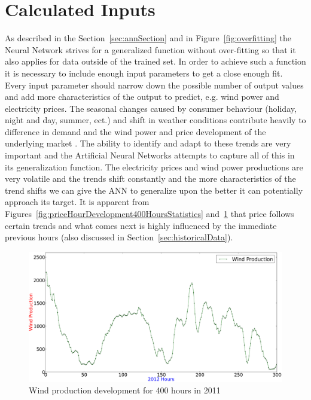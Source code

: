 \section{Calculated Inputs}
\label{sec:usingStatisticalInput}
As described in the Section~\ref{sec:annSection} and in Figure~\ref{fig:overfitting} the Neural Network strives for a generalized function without over-fitting so that it also applies for data outside of the trained set. In order to achieve such a function it is necessary to include enough input parameters to get a close enough fit. Every input parameter should narrow down the possible number of output values and add more characteristics of the output to predict, e.g. wind power and electricity prices. The seasonal changes caused by consumer behaviour (holiday, night and day, summer, ect.) and shift in weather conditions contribute heavily to difference in demand and the wind power and price development of the underlying market \cite{yamin2004adaptive,forecastingSpotPricesAccountingForWindPower}. The ability to identify and adapt to these trends are very important and the Artificial Neural Networks attempts to capture all of this in its generalization function. The electricity prices and wind power productions are very volatile and the trends shift constantly and the more characteristics of the trend shifts we can give the ANN to generalize upon the better it can potentially approach its target. It is apparent from Figures~\ref{fig:priceHourDevelopment400HoursStatistics} and~\ref{fig:windHourDevelopment400HoursStatistics} that price follows certain trends and what comes next is highly influenced by the immediate previous hours (also discussed in Section~\ref{sec:historicalData}). 

\begin{figure}[H]
\centering
\includegraphics[width=0.99\linewidth,natwidth=898,natheight=587]{billeder/productionTendency400Hours.png}
\caption{Wind production development for 400 hours in 2011}
\label{fig:windHourDevelopment400HoursStatistics}
\end{figure}

